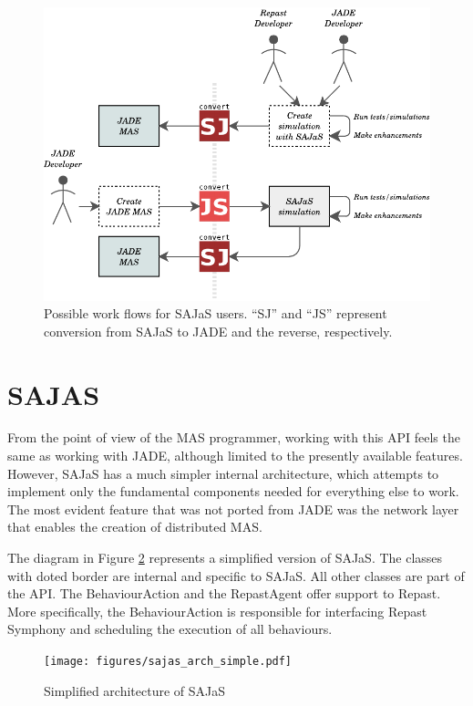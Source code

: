 \documentclass[a4paper,twoside]{article}
\begin{document}
\begin{figure}
	\centering
	\includegraphics[width=\linewidth]{figures/prototypeFlow.pdf}
	\caption{
		Possible work flows for SAJaS users. ``SJ'' and ``JS'' represent conversion from SAJaS to JADE and the reverse, respectively.
	}
	\label{fig:prototypeFlow}
\end{figure}

\section{\uppercase{SAJaS}}
\label{sec:SAJaS}
\noindent From the point of view of the MAS programmer, working with this API feels the same as working with JADE, although limited to the presently available features. However, SAJaS has a much simpler internal architecture, which attempts to implement only the fundamental components needed for everything else to work. The most evident feature that was not ported from JADE was the network layer that enables the creation of distributed MAS.

The diagram in Figure \ref{fig:arch} represents a simplified version of SAJaS. The classes with doted border are internal and specific to SAJaS. All other classes are part of the API. The BehaviourAction and the RepastAgent offer support to Repast. More specifically, the BehaviourAction is responsible for interfacing Repast Symphony and scheduling the execution of all behaviours.

\begin{figure}[h]
	\centering
	\texttt{[image: figures/sajas\_arch\_simple.pdf]}
	\caption{Simplified architecture of SAJaS}
	\label{fig:arch}
\end{figure}
\end{document}

